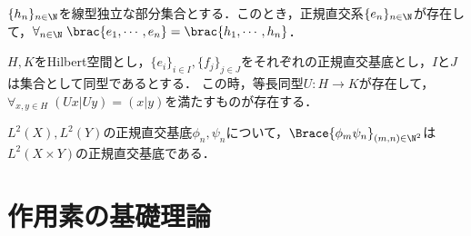 \documentclass[uplatex,dvipdfmx]{jsreport}
\begin{document}
\begin{theorem}
    $\{h_n\}_{n\in\N}$を線型独立な部分集合とする．このとき，正規直交系$\{e_n\}_{n\in\N}$が存在して，$\forall_{n\in\N}\;\brac{e_1,\cdots,e_n}=\brac{h_1,\cdots,h_n}$．
\end{theorem}

\begin{proposition}[Hilbert空間の同型類]\label{prop-characterization-of-isomorphism-of-Hilbert-spaces}
    $H,K$をHilbert空間とし，$\{e_i\}_{i\in I},\{f_j\}_{j\in J}$をそれぞれの正規直交基底とし，$I$と$J$は集合として同型であるとする．
    この時，等長同型$U:H\to K$が存在して，$\forall_{x,y\in H}\;(Ux|Uy)=(x|y)$を満たすものが存在する．
\end{proposition}

\begin{proposition}[直積空間の正規直交基底は積で与えられる]
    $L^2(X),L^2(Y)$の正規直交基底$\phi_n,\psi_n$について，$\Brace{\phi_m\psi_n}_{(m,n)\in\N^2}$は$L^2(X\times Y)$の正規直交基底である．
\end{proposition}

\section{作用素の基礎理論}
\end{document}
